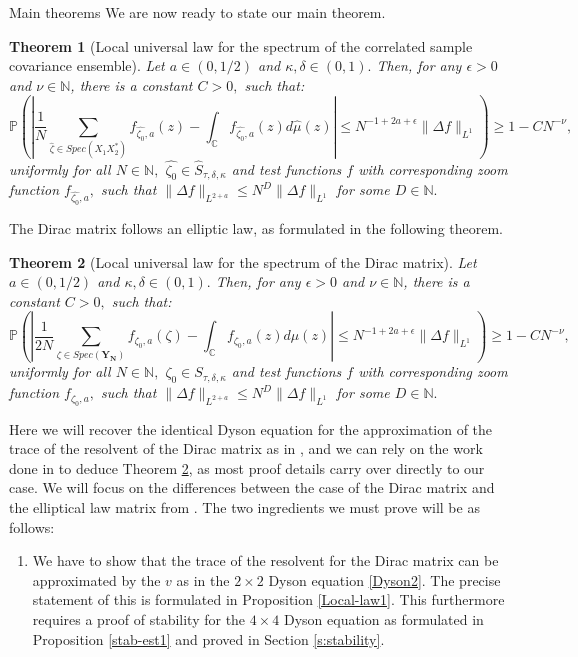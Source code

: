 \documentclass[11pt, a4paper, oneside]{book}
\numberwithin{equation}{chapter}
\newtheorem{thm}{Theorem}[section]
\begin{document}
\begin{section}{Main theorems}
We are now ready to state our main theorem.
%
\begin{thm}[Local universal law for the spectrum of the correlated sample covariance ensemble] \label{main'}
%
Let $a\in (0,1/2)$ and $\kappa,\delta \in (0,1).$ Then, for any $\epsilon>0$ and $\nu \in \mathbb{N}$, there is a constant $C>0,$ such that:
%
\[
\mathbb{P} \left ( \left | \frac{1}{N}\sum \limits_{\widehat{\zeta} \in Spec({X_1X_2^*})}f_{\widehat{\zeta_0},a} (z) - \int_{\mathbb{C}} f_{\widehat{\zeta_0},a} (z) d{\widehat{\mu}}(z)  \right | \leq N^{-1+2a+\epsilon} \|\Delta f\|_{L^1} \right ) \geq 1 - CN^{-\nu},
\]
uniformly for all $N \in \mathbb{N},$ $\widehat{\zeta_0} \in \widehat{S}_{\tau,\delta, \kappa}$ and test functions $f$ with corresponding zoom function $f_{\widehat{\zeta_0},a},$ such that $\|\Delta f\|_{L^{2+a}} \leq N^D \| \Delta f \|_{L^1}$ for some $D\in \mathbb{N}.$
\end{thm}
%
The Dirac matrix follows an elliptic law, as formulated in the following theorem.
%
\begin{thm}[Local universal law for the spectrum of the Dirac matrix] \label{main}
%
Let $a\in (0,1/2)$ and $\kappa,\delta \in (0,1).$ Then, for any $\epsilon>0$ and $\nu \in \mathbb{N}$, there is a constant $C>0,$ such that:
%
\[
\mathbb{P} \left ( \left | \frac{1}{2N}\sum \limits_{\zeta \in Spec(\mathbf{Y_N})} f_{\zeta_0,a} (\zeta) - \int_{\mathbb{C}} f_{\zeta_0,a} (z) d{\mu}(z)  \right | \leq N^{-1+2a+\epsilon} \|\Delta f\|_{L^1} \right ) \geq 1 - CN^{-\nu},
\]
uniformly for all $N \in \mathbb{N},$ $\zeta_0 \in {S}_{\tau,\delta, \kappa}$ and test functions $f$ with corresponding zoom function $f_{\zeta_0,a},$ such that $\|\Delta f\|_{L^{2+a}} \leq N^D \| \Delta f \|_{L^1}$ for some $D\in \mathbb{N}.$
\end{thm}
%
Here we will recover the identical Dyson equation for the approximation of the trace of the resolvent of the Dirac matrix as in \cite{alt2022local}, and we can rely on the work done in \cite{alt2022local} to deduce Theorem \ref{main}, as most proof details carry over directly to our case. We will focus on the differences between the case of the Dirac matrix and the elliptical law matrix from \cite{alt2022local}. The two ingredients we must prove will be as follows:
%
\begin{enumerate}
%
\item We have to show that the trace of the resolvent for the Dirac matrix can be approximated by the $v$ as in the $ 2 \times 2$ Dyson equation \eqref{Dyson2}. The precise statement of this is formulated in Proposition \ref{Local-law1}. This furthermore requires a proof of stability for the $4 \times 4$ Dyson equation as formulated in Proposition \ref{stab-est1} and proved in Section \ref{s:stability}.

\end{enumerate}
\end{section}
\end{document}
